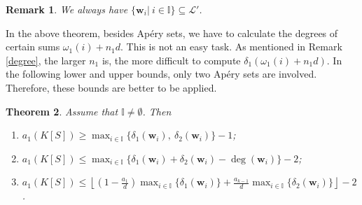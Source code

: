 \documentclass[11pt]{article}
\newtheorem{Theorem}{Theorem}[section]
\newtheorem{Remark}[Theorem]{Remark}
\def\deg{\operatorname{deg}}
\def\wbf{{\mathbf w}}
\def\Lcal{{\mathcal L}}
\def\Iset{{\mathbb I}}
\theoremstyle{remark}
\theoremstyle{definition}
\begin{document}
\begin{Remark} \label{A4R} {\rm We always have
 $\{\wbf_i|\ i\in \Iset\} \subseteq \Lcal'$.}
\end{Remark}

In the above theorem, besides Ap\'ery sets, we have to calculate the degrees of certain sums $\omega_1(i) + n_1d$. This is not an easy  task. As mentioned in Remark \ref{degree}, the larger $n_1$ is, the more difficult to compute $\delta_1(\omega_1(i)+ n_1d)$.  In the following lower and upper bounds,  only two Ap\'ery sets are involved. Therefore, these bounds are better to be applied.

\begin{Theorem} \label{A4} Assume that $\Iset \neq \emptyset$. Then
\begin{enumerate}[\((i)\)]
    \item $a_1(K[S])  \geq \max_{i\in \Iset}
\{\delta_1(\wbf_i),\ \delta_2(\wbf_i)\} - 1$;
\item $a_1(K[S])  \leq \max_{i\in \Iset}
 \{\delta_1(\wbf_i) +  \delta_2(\wbf_i) - \deg(\wbf_i) \} - 2 $;
 \item $a_1(K[S])  \leq  \left\lfloor \left( 1- \frac{a_1}{d} \right)  \max_{i\in \Iset} \{\delta_1(\wbf_i) \} +  \frac{a_{k-1}}{d}  \max_{i\in \Iset}
\{  \delta_2(\wbf_i) \} \right\rfloor - 2$.
\end{enumerate}
\end{Theorem}
\end{document}
